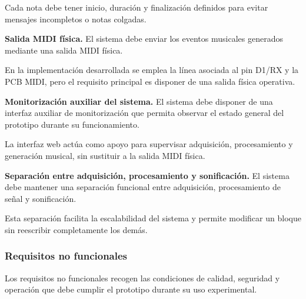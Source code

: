 \documentclass[../main.tex]{subfiles}
\begin{document}
\begin{description}[leftmargin=!,labelwidth=1.8cm]
    Cada nota debe tener inicio, duración y finalización definidos para evitar mensajes incompletos o notas colgadas.

    \item[RF-12] \textbf{Salida MIDI física.} El sistema debe enviar los eventos musicales generados mediante una salida MIDI física.

    En la implementación desarrollada se emplea la línea asociada al pin D1/RX y la PCB MIDI, pero el requisito principal es disponer de una salida física operativa.

    \item[RF-13] \textbf{Monitorización auxiliar del sistema.} El sistema debe disponer de una interfaz auxiliar de monitorización que permita observar el estado general del prototipo durante su funcionamiento.

    La interfaz web actúa como apoyo para supervisar adquisición, procesamiento y generación musical, sin sustituir a la salida MIDI física.

    \item[RF-14] \textbf{Separación entre adquisición, procesamiento y sonificación.} El sistema debe mantener una separación funcional entre adquisición, procesamiento de señal y sonificación.

    Esta separación facilita la escalabilidad del sistema y permite modificar un bloque sin reescribir completamente los demás.

\end{description}

\subsubsection{Requisitos no funcionales}

Los requisitos no funcionales recogen las condiciones de calidad, seguridad y operación que debe cumplir el prototipo durante su uso experimental.
\end{document}
